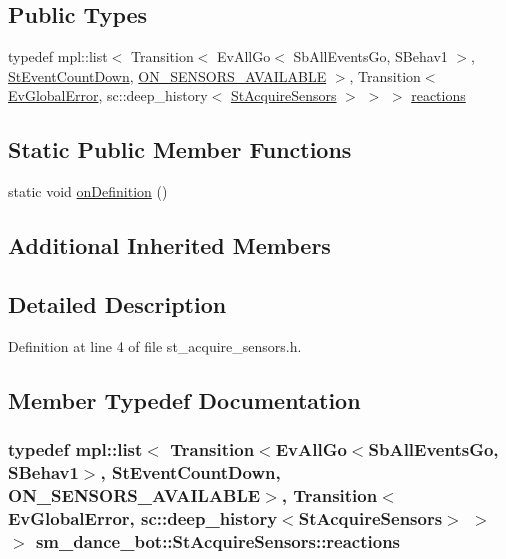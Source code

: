 \subsection*{Public Types}
\begin{DoxyCompactItemize}
\item 
typedef mpl\+::list$<$ Transition$<$ Ev\+All\+Go$<$ Sb\+All\+Events\+Go, S\+Behav1 $>$, \hyperlink{structsm__dance__bot_1_1StEventCountDown}{St\+Event\+Count\+Down}, \hyperlink{structsm__dance__bot_1_1StAcquireSensors_1_1ON__SENSORS__AVAILABLE}{O\+N\+\_\+\+S\+E\+N\+S\+O\+R\+S\+\_\+\+A\+V\+A\+I\+L\+A\+B\+LE} $>$, Transition$<$ \hyperlink{structsm__dance__bot_1_1EvGlobalError}{Ev\+Global\+Error}, sc\+::deep\+\_\+history$<$ \hyperlink{structsm__dance__bot_1_1StAcquireSensors}{St\+Acquire\+Sensors} $>$ $>$ $>$ \hyperlink{structsm__dance__bot_1_1StAcquireSensors_a60319e8dcd4318a3ab3f03d49f223033}{reactions}
\end{DoxyCompactItemize}
\subsection*{Static Public Member Functions}
\begin{DoxyCompactItemize}
\item 
static void \hyperlink{structsm__dance__bot_1_1StAcquireSensors_ae30f4b633faa922070fc8412b6dd78fc}{on\+Definition} ()
\end{DoxyCompactItemize}
\subsection*{Additional Inherited Members}


\subsection{Detailed Description}


Definition at line 4 of file st\+\_\+acquire\+\_\+sensors.\+h.



\subsection{Member Typedef Documentation}
\subsubsection[{\texorpdfstring{reactions}{reactions}}]{\setlength{\rightskip}{0pt plus 5cm}typedef mpl\+::list$<$ Transition$<$Ev\+All\+Go$<$Sb\+All\+Events\+Go, S\+Behav1$>$, {\bf St\+Event\+Count\+Down}, {\bf O\+N\+\_\+\+S\+E\+N\+S\+O\+R\+S\+\_\+\+A\+V\+A\+I\+L\+A\+B\+LE}$>$, Transition$<${\bf Ev\+Global\+Error}, sc\+::deep\+\_\+history$<${\bf St\+Acquire\+Sensors}$>$ $>$ $>$ {\bf sm\+\_\+dance\+\_\+bot\+::\+St\+Acquire\+Sensors\+::reactions}}\hypertarget{structsm__dance__bot_1_1StAcquireSensors_a60319e8dcd4318a3ab3f03d49f223033}{}\label{structsm__dance__bot_1_1StAcquireSensors_a60319e8dcd4318a3ab3f03d49f223033}


